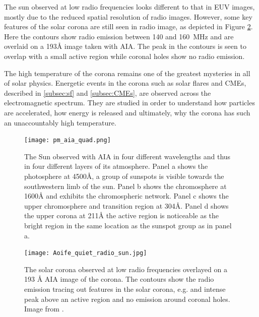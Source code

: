 The sun observed at low radio frequencies looks different to that in EUV images, mostly due to the reduced spatial resolution of radio images. However, some key features of the solar corona are still seen in radio image, as depicted in Figure \ref{fig:qs_radio}. Here the contours show radio emission between 140 and 160~MHz and are overlaid on a 193{\AA} image taken with AIA. The peak in the contours is seen to overlap with a small active region while coronal holes show no radio emission.

The high temperature of the corona remains one of the greatest mysteries in all of solar physics. Energetic events in the corona such as solar flares and CMEs, described in \ref{subsec:sf} and \ref{subsec:CMEs}, are observed across the electromagnetic spectrum. They are studied in order to understand how particles are accelerated, how energy is released and ultimately, why the corona has such an unaccountably high temperature.

\begin{figure}
\centering
\texttt{[image: pm\_aia\_quad.png]}
\caption[The solar atmosphere at different wavelengths.]{The Sun observed with AIA in four different wavelengths and thus in four different layers of its atmosphere. Panel a shows the photosphere at 4500{\AA}, a group of sunspots is visible towards the southwestern limb of the sun. Panel b shows the chromosphere at 1600{\AA} and exhibits the chromospheric network. Panel c shows the upper chromosphere and transition region at 304{\AA}. Panel d shows the upper corona at 211{\AA} the active region is noticeable as the bright region in the same location as the sunspot group as in panel a.}
\label{fig:aia_quad}
\end{figure}

\begin{figure}
\centering
\texttt{[image: Aoife\_quiet\_radio\_sun.jpg]}
\caption[The quiet Sun at low frequency radio wavelengths.]{The solar corona observed at low radio frequencies overlayed on a 193 {\AA} AIA image of the corona. The contours show the radio emission tracing out features in the solar corona, e.g. and intense peak above an active region and no emission around coronal holes. Image from \cite{Ryan2021}.}
\label{fig:qs_radio}
\end{figure}
